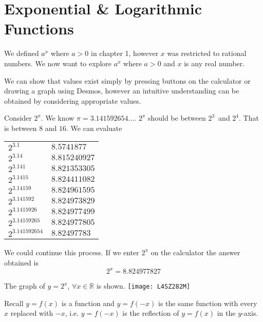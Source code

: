 \chapter[Exponential Functions]{Exponential \& Logarithmic \\Functions}
We defined $a^{x}$ where $a >0$ in chapter 1, however $x$ was restricted to rational numbers. We now want to explore $a^{x}$ where $a >0$ and $x$ is any real number. 

We can show that values exist simply by pressing buttons on the calculator or drawing
a graph using Desmos, however an intuitive understanding can be obtained by considering appropriate values. 

Consider $2^{\pi }$. We know $\pi  =3.141592654 \ldots $. $2^{\pi }$ should be between $2^{3}$\ and $2^{4}$. That is between $8$ and $16$. We can evaluate 

\qquad \qquad \qquad \qquad \qquad \qquad \qquad \qquad
\begin{tabular}[c]{ll}$2^{3.1}$  & $8.5741877$  \\
	$2^{3.14}$  & $8.815240927$  \\
	$2^{3.141}$  & $8.821353305$  \\
	$2^{3.1415}$  & $8.824411082$  \\
	$2^{3.14159}$  & $8.824961595$  \\
	$2^{3.141592}$  & $8.824973829$  \\
	$2^{3.1415926}$  & $8.824977499$  \\
	$2^{3.14159265}$  & $8.824977805$  \\
	$2^{3.141592654}$  & $8.82497783$
\end{tabular}

We could continue this process. If
we enter $2^{\pi }$ on the calculator the answer obtained is
\begin{equation*}2^{\pi } =8.824977827
\end{equation*}

The graph of $y =2^{x}$, $ \forall x \in \mathbb{R}$ is shown. 
\texttt{[image: L4SZ282M]}

Recall $y =f (x)$ is a function and $y =f ( -x)$ is the same function with every $x$ replaced with $ -x$, i.e. $y =f ( -x)$ is the reflection of $y =f (x)$ in the $y$-axis. 

